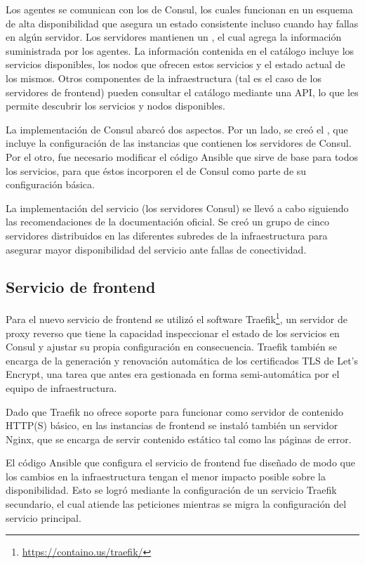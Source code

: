 Los agentes se comunican con los  de Consul, los
cuales funcionan en un esquema de alta disponibilidad que asegura un
estado consistente incluso cuando hay fallas en algún servidor. Los
servidores mantienen un , el cual agrega la
información suministrada por los agentes. La información contenida en
el catálogo incluye los servicios disponibles, los nodos que ofrecen
estos servicios y el estado actual de los mismos. Otros componentes de
la infraestructura (tal es el caso de los servidores de frontend)
pueden consultar el catálogo mediante una API, lo que les permite
descubrir los servicios y nodos disponibles.

La implementación de Consul abarcó dos aspectos. Por un lado, se creó
el , que incluye la configuración de las
instancias que contienen los servidores de Consul. Por el otro, fue
necesario modificar el código Ansible que sirve de base para todos los
servicios, para que éstos incorporen el  de Consul como
parte de su configuración básica.

La implementación del servicio (los servidores Consul) se llevó a cabo
siguiendo las recomendaciones de la documentación oficial. Se creó un
grupo de cinco servidores distribuidos en las diferentes subredes de
la infraestructura para asegurar mayor disponibilidad del servicio
ante fallas de conectividad.
%
\subsection{Servicio de frontend}
%
Para el nuevo servicio de frontend se utilizó el software
Traefik\footnote{\url{https://containo.us/traefik/}}, un servidor de
proxy reverso que tiene la capacidad inspeccionar el estado de los
servicios en Consul y ajustar su propia configuración en
consecuencia. Traefik también se encarga de la generación y renovación
automática de los certificados TLS de Let’s Encrypt, una tarea que
antes era gestionada en forma semi-automática por el equipo de
infraestructura.

Dado que Traefik no ofrece soporte para funcionar como servidor de
contenido HTTP(S) básico, en las instancias de frontend se instaló
también un servidor Nginx, que se encarga de servir contenido estático
tal como las páginas de error.

El código Ansible que configura el servicio de frontend fue diseñado
de modo que los cambios en la infraestructura tengan el menor impacto
posible sobre la disponibilidad. Esto se logró mediante la
configuración de un servicio Traefik secundario, el cual atiende las
peticiones mientras se migra la configuración del servicio principal.
%
